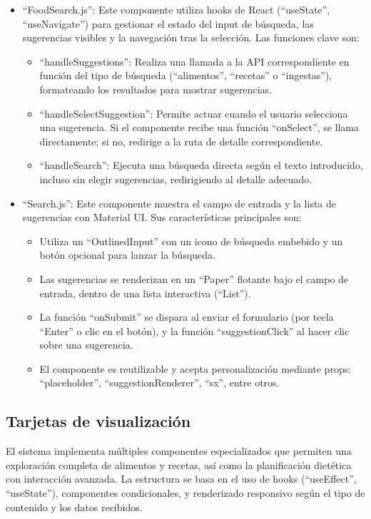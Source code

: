 \begin{itemize}
    \item ``FoodSearch.js'':
    Este componente utiliza hooks de React (``useState'', ``useNavigate'') para gestionar el estado del input de búsqueda, las sugerencias visibles y la navegación tras la selección. Las funciones clave son:
    \begin{itemize}
        \item ``handleSuggestions'': Realiza una llamada a la API correspondiente en función del tipo de búsqueda (``alimentos'', ``recetas'' o ``ingestas''), formateando los resultados para mostrar sugerencias.
        \item ``handleSelectSuggestion'': Permite actuar cuando el usuario selecciona una sugerencia. Si el componente recibe una función ``onSelect'', se llama directamente; si no, redirige a la ruta de detalle correspondiente.
        \item ``handleSearch'': Ejecuta una búsqueda directa según el texto introducido, incluso sin elegir sugerencias, redirigiendo al detalle adecuado.
    \end{itemize}

    \item ``Search.js'':
    Este componente muestra el campo de entrada y la lista de sugerencias con Material UI. Sus características principales son:
    \begin{itemize}
        \item Utiliza un ``OutlinedInput'' con un icono de búsqueda embebido y un botón opcional para lanzar la búsqueda.
        \item Las sugerencias se renderizan en un ``Paper'' flotante bajo el campo de entrada, dentro de una lista interactiva (``List'').
        \item La función ``onSubmit'' se dispara al enviar el formulario (por tecla ``Enter'' o clic en el botón), y la función ``suggestionClick'' al hacer clic sobre una sugerencia.
        \item El componente es reutilizable y acepta personalización mediante props: ``placeholder'', ``suggestionRenderer'', ``sx'', entre otros.
    \end{itemize}
\end{itemize}

\subsection*{Tarjetas de visualización}
El sistema implementa múltiples componentes especializados que permiten una exploración completa de alimentos y recetas, así como la planificación dietética con interacción avanzada. La estructura se basa en el uso de hooks (``useEffect'', ``useState''), componentes condicionales, y renderizado responsivo según el tipo de contenido y los datos recibidos.

